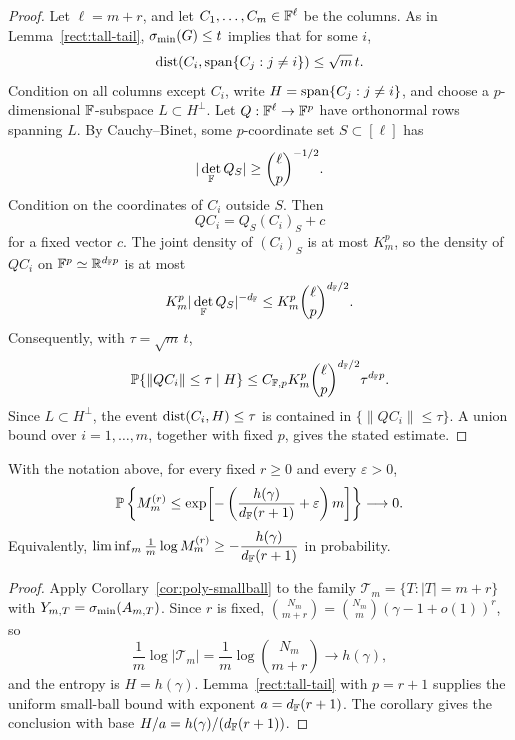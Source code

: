 \begin{proof}
Let \(\ell=m+r\), and let \(C_1,\ldots,C_m\in\mathbb{F}^\ell\) be the columns.  As in
Lemma~\ref{rect:tall-tail}, \(\sigma_{\min}(G)\le t\) implies that for some \(i\),
\[
  \operatorname{dist}(C_i,\operatorname{span}\{C_j:j\ne i\})\le\sqrt m\,t .
\]
Condition on all columns except \(C_i\), write \(H=\operatorname{span}\{C_j:j\ne i\}\), and
choose a \(p\)-dimensional \(\mathbb{F}\)-subspace \(L\subset H^\perp\).  Let
\(Q:\mathbb{F}^\ell\to\mathbb{F}^p\) have orthonormal rows spanning \(L\).  By Cauchy--Binet,
some \(p\)-coordinate set \(S\subset[\ell]\) has
\[
  |\det_{\mathbb{F}} Q_S|\ge \binom{\ell}{p}^{-1/2}.
\]
Condition on the coordinates of \(C_i\) outside \(S\).  Then
\[
  QC_i=Q_S(C_i)_S+c
\]
for a fixed vector \(c\).  The joint density of \((C_i)_S\) is at most \(K_m^p\),
so the density of \(QC_i\) on \(\mathbb{F}^p\simeq\mathbb{R}^{d_{\mathbb{F}} p}\) is at most
\[
  K_m^p|\det_{\mathbb{F}} Q_S|^{-d_{\mathbb{F}}}
  \le K_m^p\binom{\ell}{p}^{d_{\mathbb{F}}/2}.
\]
Consequently, with \(\tau=\sqrt m\,t\),
\[
  \mathbb{P}\{\|QC_i\|\le\tau\mid H\}
  \le C_{\mathbb{F},p}K_m^p\binom{\ell}{p}^{d_{\mathbb{F}}/2}\tau^{d_{\mathbb{F}} p}.
\]
Since \(L\subset H^\perp\), the event
\(\operatorname{dist}(C_i,H)\le\tau\) is contained in \(\{\|QC_i\|\le\tau\}\).  A union bound
over \(i=1,\ldots,m\), together with fixed \(p\), gives the stated estimate.
\end{proof}

\begin{theorem}\label{rect:lower}
With the notation above, for every fixed \(r\ge0\) and every \(\varepsilon>0\),
\[
  \mathbb{P}\left\{M_m^{(r)}\le
     \exp\!\left[-\left(\frac{h(\gamma)}{d_{\mathbb{F}}(r+1)}+\varepsilon\right)m\right]\right\}
  \longrightarrow0.
\]
Equivalently, \(\liminf_m\frac1m\log M_m^{(r)}\ge-\dfrac{h(\gamma)}{d_{\mathbb{F}}(r+1)}\)
in probability.
\end{theorem}

\begin{proof}
Apply Corollary~\ref{cor:poly-smallball} to the family
\(\mathcal T_m=\{T:|T|=m+r\}\) with \(Y_{m,T}=\sigma_{\min}(A_{m,T})\).  Since \(r\) is
fixed, \(\binom{N_m}{m+r}=\binom{N_m}{m}(\gamma-1+o(1))^{r}\), so
\[
  \frac1m\log|\mathcal T_m|=\frac1m\log\binom{N_m}{m+r}\to h(\gamma),
\]
and the entropy is \(H=h(\gamma)\).  Lemma~\ref{rect:tall-tail} with \(p=r+1\)
supplies the uniform small-ball bound with exponent \(a=d_{\mathbb{F}}(r+1)\).  The
corollary gives the conclusion with base \(H/a=h(\gamma)/(d_{\mathbb{F}}(r+1))\).
\end{proof}


